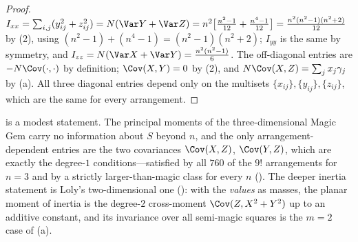 \begin{proof}
$I_{xx}=\sum_{i,j}(y_{ij}^{2}+z_{ij}^{2})=N(\Var Y+\Var Z)=n^{2}\bigl[\frac{n^{2}-1}{12}+\frac{n^{4}-1}{12}\bigr]=\frac{n^{2}(n^{2}-1)(n^{2}+2)}{12}$
by (2), using $(n^{2}-1)+(n^{4}-1)=(n^{2}-1)(n^{2}+2)$; $I_{yy}$ is the same by symmetry, and
$I_{zz}=N(\Var X+\Var Y)=\frac{n^{2}(n^{2}-1)}{6}$.  The off-diagonal entries are $-N\Cov(\cdot,\cdot)$ by definition;
$\Cov(X,Y)=0$ by (2), and $N\Cov(X,Z)=\sum_jx_j\gamma_j$ by (a).
All three diagonal entries depend only on the multisets $\{x_{ij}\},\{y_{ij}\},\{z_{ij}\}$, which are the same for every arrangement.
\end{proof}

\begin{remark}
\label{rem:inertia_modest}
 is a modest statement.  The principal moments of the three-dimensional Magic Gem carry no
information about $S$ beyond $n$, and the only arrangement-dependent entries are the two covariances $\Cov(X,Z)$,
$\Cov(Y,Z)$, which are exactly the degree-$1$ conditions---satisfied by all $760$ of the $9!$ arrangements for $n=3$
and by a strictly larger-than-magic class for every $n$ ().  The deeper
inertia statement is Loly's two-dimensional one (): with the \emph{values} as masses, the planar
moment of inertia is the degree-$2$ cross-moment $\Cov(Z,X^{2}+Y^{2})$ up to an additive constant, and its invariance
over all semi-magic squares is the $m=2$ case of (a).
\end{remark}
